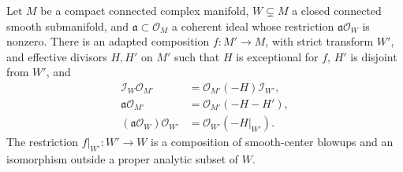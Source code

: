 \begin{theorem}\label{thm:relative-principalization}
Let $M$ be a compact connected complex manifold, $W\subsetneq M$ a closed connected smooth submanifold, and $\mathfrak a\subset\mathcal O_M$ a coherent ideal whose restriction $\mathfrak a\mathcal O_W$ is nonzero. There is an adapted composition $f\colon M'\to M$, with strict transform $W'$, and effective divisors $H,H'$ on $M'$ such that $H$ is exceptional for $f$, $H'$ is disjoint from $W'$, and
\begin{align}
 \mathcal I_W\mathcal O_{M'}&=\mathcal O_{M'}(-H)\mathcal I_{W'},
 \label{eq:relative-center-ideal}\\
 \mathfrak a\mathcal O_{M'}&=\mathcal O_{M'}(-H-H'),
 \label{eq:relative-ideal-principalization}\\
 (\mathfrak a\mathcal O_W)\mathcal O_{W'}
     &=\mathcal O_{W'}(-H|_{W'}).
 \label{eq:relative-restricted-ideal}
\end{align}
The restriction $f|_{W'}\colon W'\to W$ is a composition of smooth-center blowups and an isomorphism outside a proper analytic subset of $W$.
\end{theorem}
